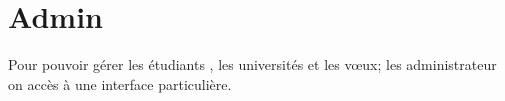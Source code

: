 \chapter{Admin}
Pour pouvoir gérer les étudiants , les universités et les vœux; les administrateur on accès à une interface particulière.